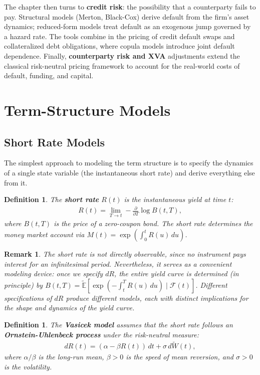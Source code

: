 \documentclass{report}
\theoremstyle{spacedplain}
\theoremstyle{spaceddefinition}
\newtheorem{definition}[theorem]{Definition}
\theoremstyle{spacedremark}
\newtheorem{remark}[theorem]{Remark}
\begin{document}
The chapter then turns to \textbf{credit risk}: the possibility that a counterparty fails to pay. Structural models (Merton, Black-Cox) derive default from the firm's asset dynamics; reduced-form models treat default as an exogenous jump governed by a hazard rate. The tools combine in the pricing of credit default swaps and collateralized debt obligations, where copula models introduce joint default dependence. Finally, \textbf{counterparty risk and XVA} adjustments extend the classical risk-neutral pricing framework to account for the real-world costs of default, funding, and capital.


\section{Term-Structure Models}

\subsection{Short Rate Models}

The simplest approach to modeling the term structure is to specify the dynamics of a single state variable (the instantaneous short rate) and derive everything else from it.

\begin{definition}
The \textbf{short rate} $R(t)$ is the instantaneous yield at time $t$:
\begin{align}
    R(t) = \lim_{T \to t} -\frac{\partial}{\partial T}\log B(t,T),
\end{align}
where $B(t,T)$ is the price of a zero-coupon bond. The short rate determines the money market account via $M(t) = \exp(\int_0^t R(u)\,du)$.
\end{definition}

\begin{remark}
The short rate is not directly observable, since no instrument pays interest for an infinitesimal period. Nevertheless, it serves as a convenient modeling device: once we specify $dR$, the entire yield curve is determined (in principle) by $B(t,T) = \widetilde{\mathbb{E}}[\exp(-\int_t^T R(u)\,du) \mid \mathcal{F}(t)]$. Different specifications of $dR$ produce different models, each with distinct implications for the shape and dynamics of the yield curve.
\end{remark}

\begin{definition}
The \textbf{Vasicek model} assumes that the short rate follows an \textbf{Ornstein-Uhlenbeck process} under the risk-neutral measure:
\begin{align}
    dR(t) = (\alpha - \beta R(t))\,dt + \sigma\,d\widetilde{W}(t),
\end{align}
where $\alpha/\beta$ is the long-run mean, $\beta > 0$ is the speed of mean reversion, and $\sigma > 0$ is the volatility.
\end{definition}
\end{document}
